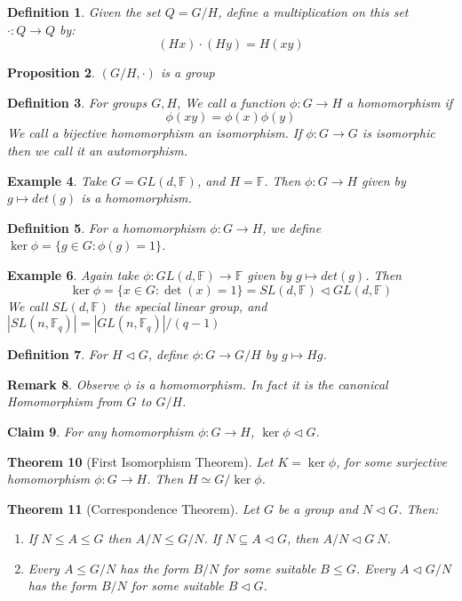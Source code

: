 \documentclass[a4paper,10pt]{article}
\newcommand{\FF}{\mathbb{F}}
\newtheorem{thm}{Theorem}
\newtheorem{Def}[thm]{Definition}
\newtheorem{cl}[thm]{Claim}
\newtheorem{prop}[thm]{Proposition}
\newtheorem{eg}[thm]{Example}
\newtheorem{rem}[thm]{Remark}
\begin{document}
\begin{Def}
Given the set $Q = G / H$, define a multiplication on this set $\cdot : Q \rightarrow Q$ by:
\[ (Hx) \cdot (Hy) = H(xy) \]
\end{Def}
\begin{prop}
$(G / H, \cdot)$ is a group
\end{prop}
\begin{Def}
For groups $G,H$, We call a function $\phi : G \rightarrow H$ a homomorphism if
\[ \phi(xy) = \phi(x) \phi(y) \]
We call a bijective homomorphism an isomorphism. If $\phi : G \rightarrow G$ is isomorphic then we call it an automorphism.
\end{Def}
\begin{eg}
Take $G = GL(d, \FF)$, and $H = \FF$. Then $\phi : G \rightarrow H$ given by $g \mapsto det(g)$ is a homomorphism.
\end{eg}
\begin{Def}
For a homomorphism $\phi : G \rightarrow H$, we define $\ker \phi = \{ g \in G : \phi(g) = 1 \}$.
\end{Def}
\begin{eg}
Again take $\phi : GL(d, \FF) \rightarrow \FF$ given by $g \mapsto det(g)$. Then 
\[ \ker \phi = \{ x \in G : \det(x) = 1 \} = SL(d,\FF) \triangleleft GL(d, \FF) \] 
We call $SL(d,\FF)$ the special linear group, and $|SL(n,\FF_q)| = |GL(n,\FF_q) | / (q - 1)$
\end{eg}
\begin{Def}
For $H \triangleleft G$, define $\phi : G \rightarrow G / H$ by $g \mapsto Hg$.
\end{Def}
\begin{rem}
Observe $\phi$ is a homomorphism. In fact it is the canonical Homomorphism from $G$ to $G / H$. 
\end{rem}
\begin{cl}
For any homomorphism $\phi : G \rightarrow H$, $\ker \phi \triangleleft G$.
\end{cl}
\begin{thm}[First Isomorphism Theorem]
Let $K = \ker \phi$, for some surjective homomorphism $\phi : G \rightarrow H$. Then $H \simeq G / \ker \phi$.
\end{thm}
\begin{thm}[Correspondence Theorem]
Let $G$ be a group and $N \triangleleft G$. Then:
\begin{enumerate}
\item If $N \leq A \leq G$ then $A / N \leq G / N$. If $N \subseteq A \triangleleft G$, then $A / N \triangleleft G \ N$.
\item Every $A \leq G / N$ has the form $B / N$ for some suitable $B \leq G$. Every $A \triangleleft G / N$ has the form $B / N$ for some suitable $B \triangleleft G$.
\end{enumerate}
\end{thm}
\end{document}

